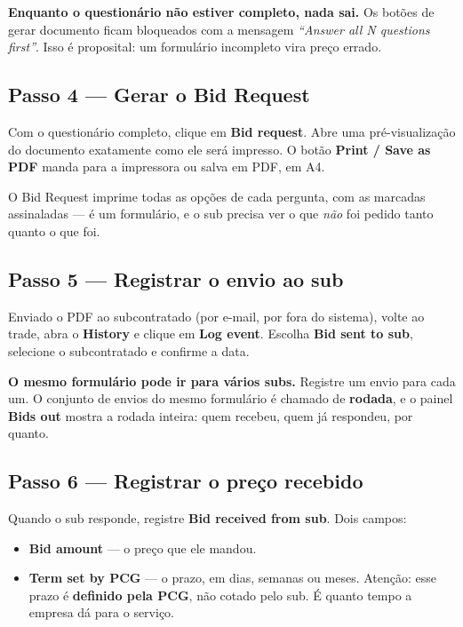 \documentclass[11pt,a4paper]{article}
\newcommand{\ui}[1]{\textbf{\textsf{#1}}}
\newenvironment{aviso}
  {\par\vspace{0.7em}\noindent
   \begin{lrbox}{\avisobox}\begin{minipage}{\dimexpr\linewidth-2.4em\relax}}
  {\end{minipage}\end{lrbox}%
   \noindent\colorbox{pcglight}{\hspace{0.6em}\usebox{\avisobox}\hspace{0.6em}}%
   \vspace{0.7em}\par}
\begin{document}
\begin{aviso}
\textbf{Enquanto o questionário não estiver completo, nada sai.} Os botões de
gerar documento ficam bloqueados com a mensagem \emph{``Answer all N questions
first''}. Isso é proposital: um formulário incompleto vira preço errado.
\end{aviso}

\subsection{Passo 4 — Gerar o Bid Request}

Com o questionário completo, clique em \ui{Bid request}. Abre uma pré-visualização
do documento exatamente como ele será impresso. O botão
\ui{Print / Save as PDF} manda para a impressora ou salva em PDF, em A4.

O Bid Request imprime todas as opções de cada pergunta, com as marcadas
assinaladas — é um formulário, e o sub precisa ver o que \emph{não} foi pedido
tanto quanto o que foi.

\subsection{Passo 5 — Registrar o envio ao sub}

Enviado o PDF ao subcontratado (por e-mail, por fora do sistema), volte ao trade,
abra o \ui{History} e clique em \ui{Log event}. Escolha \ui{Bid sent to sub},
selecione o subcontratado e confirme a data.

\textbf{O mesmo formulário pode ir para vários subs.} Registre um envio para cada
um. O conjunto de envios do mesmo formulário é chamado de \textbf{rodada}, e o
painel \ui{Bids out} mostra a rodada inteira: quem recebeu, quem já respondeu,
por quanto.

\subsection{Passo 6 — Registrar o preço recebido}

Quando o sub responde, registre \ui{Bid received from sub}. Dois campos:

\begin{itemize}
  \item \ui{Bid amount} — o preço que ele mandou.
  \item \ui{Term set by PCG} — o prazo, em dias, semanas ou meses. Atenção: esse
  prazo é \textbf{definido pela PCG}, não cotado pelo sub. É quanto tempo a
  empresa dá para o serviço.
\end{itemize}
\end{document}
